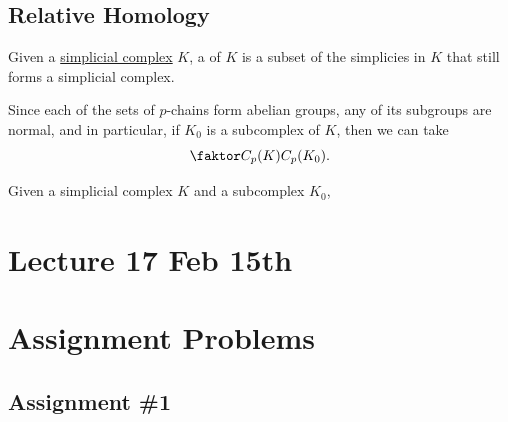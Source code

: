 \documentclass[notoc,notitlepage]{tufte-book}
\begin{document}

\section{Relative Homology}%
\label{sec:relative_homology}

\begin{defn}\label{defn:simplicial_subcomplex}
  Given a \hyperref[defn:simplicial_complex]{simplicial complex} $K$, a
   of $K$ is a subset of the simplicies in $K$ 
  that still forms a simplicial complex.
\end{defn}

Since each of the sets of $p$-chains form abelian groups, any of its subgroups
are normal, and in particular, if $K_0$ is a subcomplex of $K$, then we can take
\begin{equation*}
  \quotient{C_p(K)}{C_p(K_0)}.
\end{equation*}

\begin{defn}\label{defn:relative_chain}
  Given a simplicial complex $K$ and a subcomplex $K_0$, 
\end{defn}



\chapter{Lecture 17 Feb 15th}%
\label{chp:lecture_17_feb_15th}




\appendix

\chapter{Assignment Problems}%
\label{chp:assignment_problems}

\section{Assignment \#1}%
\label{sec:assignment_1}
\end{document}
